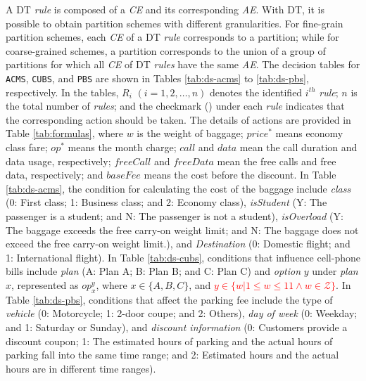 \documentclass[10pt,journal,compsoc]{IEEEtran}
\begin{document}
A DT \emph{rule} is composed of a \emph{CE} and its corresponding \emph{AE}.
With DT, it is possible to obtain partition schemes with different granularities.
For fine-grain partition schemes, each \emph{CE} of a DT \emph{rule} corresponds to a partition;
while for coarse-grained schemes, a partition corresponds to the union of a group of partitions for which all \emph{CE} of DT \emph{rules} have the same \emph{AE}.
The decision tables for \texttt{ACMS}, \texttt{CUBS}, and \texttt{PBS} are shown in Tables \ref{tab:ds-acms} to \ref{tab:ds-pbs}, respectively. In the tables, $R_i$ $(i = 1, 2, \ldots, n)$ denotes the identified $i^{th}$ \emph{rule}; $n$ is the total number of \emph{rules}; and the checkmark (\checkmark) under each \emph{rule} indicates that the corresponding action should be taken.
The details of actions are provided in Table \ref{tab:formulas}, where $w$ is the weight of baggage; $price^*$ means economy class fare; $op^*$ means the month charge; $call$ and $data$ mean the call duration and data usage, respectively; $freeCall$ and $freeData$ mean the free calls and free data, respectively; and $baseFee$ means the cost before the discount. In Table \ref{tab:ds-acms}, the condition for calculating the cost of the baggage include \emph{class} (0: First class; 1: Business class; and 2: Economy class), \emph{isStudent} (Y: The passenger is a student; and N: The passenger is not a student), \emph{isOverload} (Y: The baggage exceeds the free carry-on weight limit; and N: The baggage does not exceed the free carry-on weight limit.), and \emph{Destination} (0: Domestic flight; and 1: International flight). In Table \ref{tab:ds-cubs}, conditions that influence cell-phone bills include \emph{plan} (A: Plan A; B: Plan B; and C: Plan C) and \emph{option} $y$ under \emph{plan} $x$, represented as $op_x^y$, where $x \in \{A, B, C\}$, and \textcolor{red}{$y \in \{w|1 \le w \le 11 \wedge w \in \mathcal{Z}\} $}. In Table \ref{tab:ds-pbs}, conditions that affect the parking fee include the type of \emph{vehicle} (0: Motorcycle; 1: 2-door coupe; and 2: Others), \emph{day of week} (0: Weekday; and 1: Saturday or Sunday), and \emph{discount information} (0: Customers provide a discount coupon; 1: The estimated hours of parking and the actual hours of parking fall into the same time range; and 2: Estimated hours and the actual hours are in different time ranges).
\end{document}
